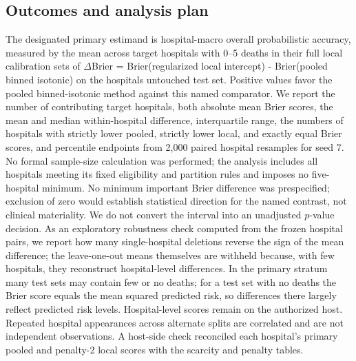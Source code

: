 \documentclass[11pt]{article}
\begin{document}
\subsection*{Outcomes and analysis plan}\label{outcomes-and-analysis-plan}

The designated primary estimand is hospital-macro overall probabilistic accuracy, measured by the mean across target hospitals with 0--5 deaths in their full local calibration sets of $\Delta$Brier = Brier(regularized local intercept) - Brier(pooled binned isotonic) on the hospital\textquotesingle s untouched test set. Positive values favor the pooled binned-isotonic method against this named comparator. We report the number of contributing target hospitals, both absolute mean Brier scores, the mean and median within-hospital difference, interquartile range, the numbers of hospitals with strictly lower pooled, strictly lower local, and exactly equal Brier scores, and percentile endpoints from 2,000 paired hospital resamples for seed 7. No formal sample-size calculation was performed; the analysis includes all hospitals meeting its fixed eligibility and partition rules and imposes no five-hospital minimum. No minimum important Brier difference was prespecified; exclusion of zero would establish statistical direction for the named contrast, not clinical materiality. We do not convert the interval into an unadjusted $p$-value decision. As an exploratory robustness check computed from the frozen hospital pairs, we report how many single-hospital deletions reverse the sign of the mean difference; the leave-one-out means themselves are withheld because, with few hospitals, they reconstruct hospital-level differences. In the primary stratum many test sets may contain few or no deaths; for a test set with no deaths the Brier score equals the mean squared predicted risk, so differences there largely reflect predicted risk levels. Hospital-level scores remain on the authorized host. Repeated hospital appearances across alternate splits are correlated and are not independent observations. A host-side check reconciled each hospital's primary pooled and penalty-2 local scores with the scarcity and penalty tables.
\end{document}
